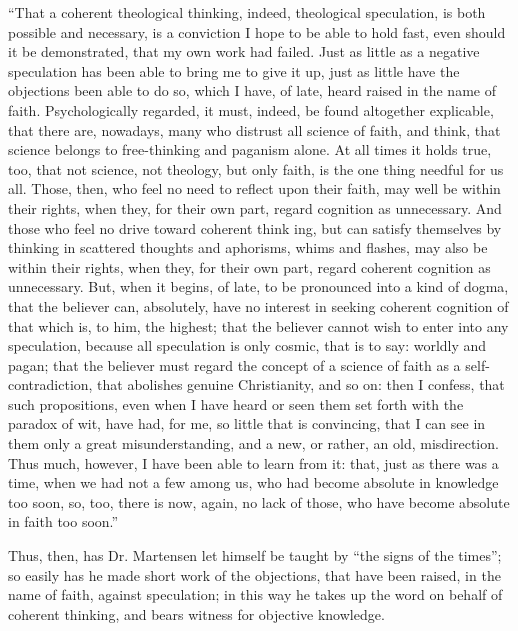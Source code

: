 \documentclass[12pt]{book}
\begin{document}
``That a coherent theological thinking, indeed, theological speculation, is both possible and necessary, is a conviction I hope to be able to hold fast, even should it be demonstrated, that my own work had failed. Just as little as a negative speculation has been able to bring me to give it up, just as little have the objections been able to do so, which I have, of late, heard raised in the name of faith. Psychologically regarded, it must, indeed, be found altogether explicable, that there are, nowadays, many who distrust all science of faith, and think, that science belongs to free-thinking and paganism alone. At all times it holds true, too, that not science, not theology, but only faith, is the one thing needful for us all. Those, then, who feel no need to reflect upon their faith, may well be within their rights, when they, for their own part, regard cognition as unnecessary. And those who feel no drive toward coherent think\-%
ing, but can satisfy themselves by thinking in scattered thoughts and aphorisms, whims and flashes, may also be within their rights, when they, for their own part, regard coherent cognition as unnecessary. But, when it begins, of late, to be pronounced into a kind of dogma, that the believer can, absolutely, have no interest in seeking coherent cognition of that which is, to him, the highest; that the believer cannot wish to enter into any speculation, because all speculation is only cosmic, that is to say: worldly and pagan; that the believer must regard the concept of a science of faith as a self-contradiction, that abolishes genuine Christianity, and so on: then I confess, that such propositions, even when I have heard or seen them set forth with the paradox of wit, have had, for me, so little that is convincing, that I can see in them only a great misunderstanding, and a new, or rather, an old, misdirection. Thus much, however, I have been able to learn from it: that, just as there was a time, when we had not a few among us, who had become absolute in knowledge too soon, so, too, there is now, again, no lack of those, who have become absolute in faith too soon.''

Thus, then, has Dr. Martensen let himself be taught by ``the signs of the times''; so easily has he made short work of the objections, that have been raised, in the name of faith, against speculation; in this way he takes up the word on behalf of coherent thinking, and bears witness for objective knowledge.
\end{document}
